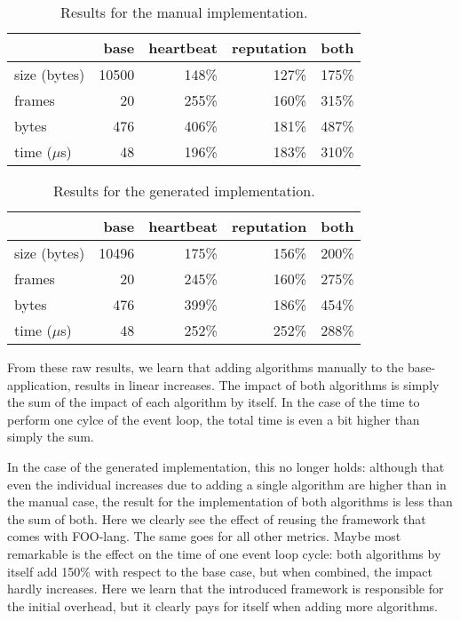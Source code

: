\documentclass[conference]{IEEEtran}
\begin{document}
\begin{table}[H]
  \centering
  \begin{tabular}{lrrrr}
  \hline
      & base & heartbeat & reputation & both\\
  \hline
  size (bytes) & 10500 & 148\% & 127\% & 175\%\\
  frames & 20 & 255\% & 160\% & 315\%\\
  bytes & 476 & 406\% & 181\% & 487\%\\
  time ($\mu$s) & 48 & 196\% & 183\% & 310\%\\
  \hline
  \end{tabular}
  \caption{Results for the manual implementation.}
  \label{tbl:manual}
\end{table}

\begin{table}[H]
  \centering
  \begin{tabular}{lrrrr}
  \hline
         & base & heartbeat & reputation & both\\
  \hline
  size (bytes) & 10496 & 175\% & 156\% & 200\%\\
  frames & 20 & 245\% & 160\% & 275\%\\
  bytes & 476 & 399\% & 186\% & 454\%\\
  time ($\mu$s) & 48 & 252\% & 252\% & 288\%\\
  \hline
  \end{tabular}
  \caption{Results for the generated implementation.}
  \label{tbl:generated}
\end{table}

From these raw results, we learn that adding algorithms manually to the
base-application, results in linear increases. The impact of both algorithms is
simply the sum of the impact of each algorithm by itself. In the case of the
time to perform one cylce of the event loop, the total time is even a bit
higher than simply the sum.

In the case of the generated implementation, this no longer holds: although
that even the individual increases due to adding a single algorithm are higher
than in the manual case, the result for the implementation of both algorithms
is less than the sum of both. Here we clearly see the effect of reusing the
framework that comes with FOO-lang. The same goes for all other metrics. Maybe
most remarkable is the effect on the time of one event loop cycle: both
algorithms by itself add 150\% with respect to the base case, but when
combined, the impact hardly increases. Here we learn that the introduced
framework is responsible for the initial overhead, but it clearly pays for
itself when adding more algorithms.
\end{document}
